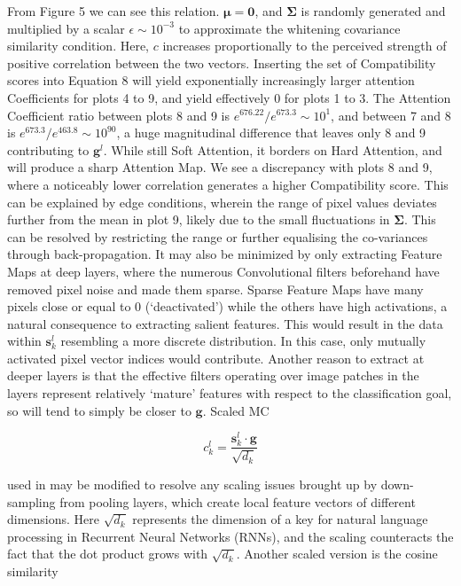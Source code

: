 \documentclass[11pt]{article}
\begin{document}
From Figure 5 we can see this relation. $\bm{\mu} = \bm{0}$, and $\bm{\Sigma}$ is randomly generated and multiplied by a scalar $\epsilon \sim 10^{-3}$ to approximate the whitening covariance similarity condition. Here, $c$ increases proportionally to the perceived strength of positive correlation between the two vectors. Inserting the set of Compatibility scores into Equation 8 will yield exponentially increasingly larger attention Coefficients for plots 4 to 9, and yield effectively 0 for plots 1 to 3. The Attention Coefficient ratio between plots 8 and 9 is $e^{676.22}/e^{673.3} \sim 10^{1}$, and between 7 and 8 is $e^{673.3}/e^{463.8} \sim 10^{90}$, a huge magnitudinal difference that leaves only 8 and 9 contributing to $\bm{g}^l$. While still Soft Attention, it borders on Hard Attention, and will produce a sharp Attention Map. We see a discrepancy with plots 8 and 9, where a noticeably lower correlation generates a higher Compatibility score. This can be explained by edge conditions, wherein the range of pixel values deviates further from the mean in plot 9, likely due to the small fluctuations in $\bm{\Sigma}$. This can be resolved by restricting the range or further equalising the co-variances through back-propagation. It may also be minimized by only extracting Feature Maps at deep layers, where the numerous Convolutional filters beforehand have removed pixel noise and made them sparse. Sparse Feature Maps have many pixels close or equal to 0 (`deactivated') while the others have high activations, a natural consequence to extracting salient features. This would result in the data within $\bm{s}^{l}_{k}$ resembling a more discrete distribution. In this case, only mutually activated pixel vector indices would contribute. Another reason to extract at deeper layers is that the effective filters operating over image patches in the layers represent relatively `mature’ features with respect to the classification goal, so will tend to simply be closer to $\bm{g}$. Scaled MC          

\begin{equation}
c^{l}_{k} = \frac{\bm{s}^{l}_{k} \cdot \bm{g}}{\sqrt{d_k}}
\end{equation}

used in \cite{vaswani} may be modified to resolve any scaling issues brought up by down-sampling from pooling layers, which create local feature vectors of different dimensions. Here $\sqrt{d_k}$ represents the dimension of a key for natural language processing in Recurrent Neural Networks (RNNs), and the scaling counteracts the fact that the dot product grows with $\sqrt{d_k}$. Another scaled version is the cosine similarity
\end{document}
